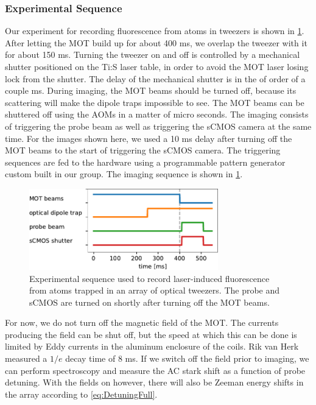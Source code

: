 \subsubsection*{Experimental Sequence}

Our experiment for recording fluorescence from atoms in tweezers is shown in \cref{fig:Sequence}.
After letting the MOT build up for about 400 ms, we overlap the tweezer with it for about 150 ms.
Turning the tweezer on and off is controlled by a mechanical shutter positioned on the \ac{Ti:S} laser table, in order to avoid the MOT laser losing lock from the shutter.
The delay of the mechanical shutter is in the of order of a couple ms. During imaging, the MOT beams should be turned off, because its scattering will make the dipole traps impossible to see. 
The MOT beams can be shuttered off using the \ac{AOM}s in a matter of micro seconds. 
The imaging consists of triggering the probe beam as well as triggering the sCMOS camera at the same time. 
For the images shown here, we used a 10 ms delay after turning off the MOT beams to the start of triggering the sCMOS camera. 
The triggering sequences are fed to the hardware using a programmable pattern generator custom built in our group. 
The imaging sequence is shown in \cref{fig:Sequence}.
\begin{figure}
    \centering
    \includegraphics[width=0.73\textwidth]{figures/Sequence.pdf}
    \caption{Experimental sequence used to record laser-induced fluorescence from atoms trapped in an array of optical tweezers.
    The probe and sCMOS are turned on shortly after turning off the MOT beams. }
    \label{fig:Sequence}
\end{figure}
For now, we do not turn off the magnetic field of the MOT.
The currents producing the field can be shut off, but the speed at which this can be done is limited by Eddy currents in the aluminum enclosure of the coils. 
Rik van Herk measured a $1/e$ decay time of 8 ms.
If we switch off the field prior to imaging, we can perform spectroscopy and measure the AC stark shift as a function of probe detuning. 
With the fields on however, there will also be Zeeman energy shifts in the array according to \cref{eq:DetuningFull}. 

